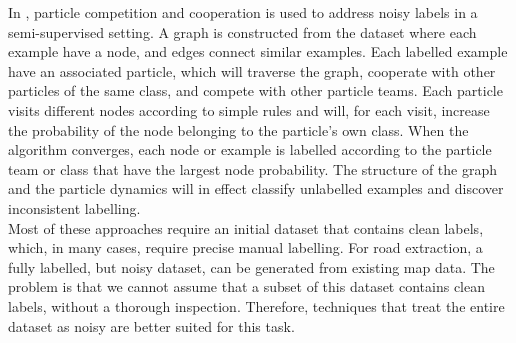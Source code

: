 In \citep{Breve_particle}, particle competition and cooperation is used to address noisy labels in a semi-supervised setting. A graph is constructed from the dataset where each example have a node, and edges connect similar examples. Each labelled example have an associated particle, which will traverse the graph, cooperate with other particles of the same class, and compete with other particle teams. Each particle visits different nodes according to simple rules and will, for each visit, increase the probability of the node belonging to the particle's own class. When the algorithm converges, each node or example is labelled according to the particle team or class that have the largest node probability. The structure of the graph and the particle dynamics will in effect classify unlabelled examples and discover inconsistent labelling. \\

Most of these approaches require an initial dataset that contains clean labels, which, in many cases, require precise manual labelling. For road extraction, a fully labelled, but noisy dataset, can be generated from existing map data. The problem is that we cannot assume that a subset of this dataset contains clean labels, without a thorough inspection. Therefore, techniques that treat the entire dataset as noisy are better suited for this task. 

